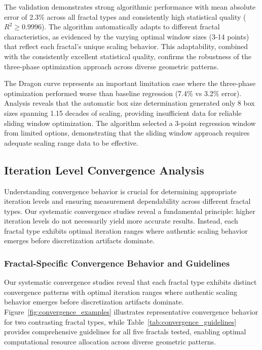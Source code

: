 \documentclass[preprint,12pt]{elsarticle}
\def\textbf#1{#1}%
\begin{document}
The validation demonstrates strong algorithmic performance with mean absolute error of 2.3\% across all fractal types and consistently high statistical quality ($R^2 \geq 0.9996$). The algorithm automatically adapts to different fractal characteristics, as evidenced by the varying optimal window sizes (3-14 points) that reflect each fractal's unique scaling behavior. This adaptability, combined with the consistently excellent statistical quality, confirms the robustness of the three-phase optimization approach across diverse geometric patterns.

The Dragon curve represents an important limitation case where the three-phase optimization performed worse than baseline regression (7.4\% vs 3.2\% error). Analysis reveals that the automatic box size determination generated only 8 box sizes spanning 1.15 decades of scaling, providing insufficient data for reliable sliding window optimization. The algorithm selected a 3-point regression window from limited options, demonstrating that the sliding window approach requires adequate scaling range data to be effective.

\subsection{Iteration Level Convergence Analysis}
\label{subsec:convergence_analysis}

Understanding convergence behavior is crucial for determining appropriate iteration levels and ensuring measurement dependability across different fractal types. Our systematic convergence studies reveal a fundamental principle: \textbf{higher iteration levels do not necessarily yield more accurate results}. Instead, each fractal type exhibits optimal iteration ranges where authentic scaling behavior emerges before discretization artifacts dominate.

\subsubsection{Fractal-Specific Convergence Behavior and Guidelines}

Our systematic convergence studies reveal that each fractal type exhibits distinct convergence patterns with optimal iteration ranges where authentic scaling behavior emerges before discretization artifacts dominate. Figure~\ref{fig:convergence_examples} illustrates representative convergence behavior for two contrasting fractal types, while Table~\ref{tab:convergence_guidelines} provides comprehensive guidelines for all five fractals tested, enabling optimal computational resource allocation across diverse geometric patterns.
\end{document}
